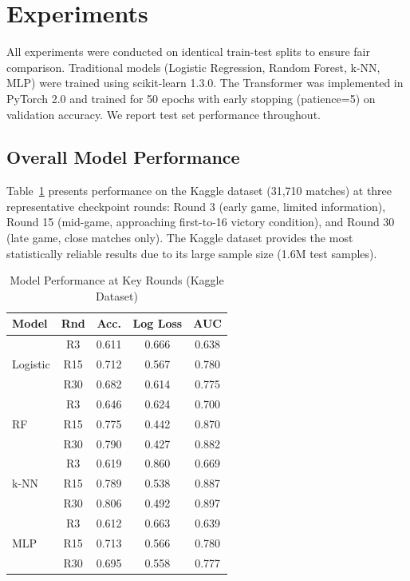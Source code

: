 \documentclass[10pt,twocolumn]{article}
\begin{document}
\section{Experiments}

All experiments were conducted on identical train-test splits to ensure fair comparison. Traditional models (Logistic Regression, Random Forest, k-NN, MLP) were trained using scikit-learn 1.3.0. The Transformer was implemented in PyTorch 2.0 and trained for 50 epochs with early stopping (patience=5) on validation accuracy. We report test set performance throughout.

\subsection{Overall Model Performance}

Table~\ref{tab:main_results} presents performance on the Kaggle dataset (31,710 matches) at three representative checkpoint rounds: Round 3 (early game, limited information), Round 15 (mid-game, approaching first-to-16 victory condition), and Round 30 (late game, close matches only). The Kaggle dataset provides the most statistically reliable results due to its large sample size (1.6M test samples).

\begin{table}[h]
\centering
\caption{Model Performance at Key Rounds (Kaggle Dataset)}
\label{tab:main_results}
\scriptsize
\setlength{\tabcolsep}{2.5pt}
\begin{tabular}{lcccc}
\toprule
\textbf{Model} & \textbf{Rnd} & \textbf{Acc.} & \textbf{Log Loss} & \textbf{AUC} \\
\midrule
\multirow{3}{*}{Logistic} & R3 & 0.611 & 0.666 & 0.638 \\
 & R15 & 0.712 & 0.567 & 0.780 \\
 & R30 & 0.682 & 0.614 & 0.775 \\
\midrule
\multirow{3}{*}{RF} & R3 & 0.646 & 0.624 & 0.700 \\
 & R15 & 0.775 & 0.442 & 0.870 \\
 & R30 & 0.790 & 0.427 & 0.882 \\
\midrule
\multirow{3}{*}{k-NN} & R3 & 0.619 & 0.860 & 0.669 \\
 & R15 & 0.789 & 0.538 & 0.887 \\
 & R30 & 0.806 & 0.492 & 0.897 \\
\midrule
\multirow{3}{*}{MLP} & R3 & 0.612 & 0.663 & 0.639 \\
 & R15 & 0.713 & 0.566 & 0.780 \\
 & R30 & 0.695 & 0.558 & 0.777 \\
\bottomrule
\end{tabular}
\end{table}
\end{document}
